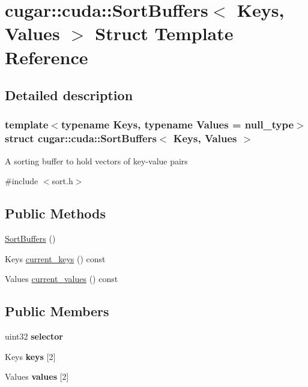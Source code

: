 \hypertarget{structcugar_1_1cuda_1_1_sort_buffers}{}\section{cugar\+:\+:cuda\+:\+:Sort\+Buffers$<$ Keys, Values $>$ Struct Template Reference}
\label{structcugar_1_1cuda_1_1_sort_buffers}


\subsection{Detailed description}
\subsubsection*{template$<$typename Keys, typename Values = null\+\_\+type$>$\newline
struct cugar\+::cuda\+::\+Sort\+Buffers$<$ Keys, Values $>$}

A sorting buffer to hold vectors of key-\/value pairs 

{\ttfamily \#include $<$sort.\+h$>$}

\subsection*{Public Methods}
\begin{DoxyCompactItemize}
\item 
\hyperlink{structcugar_1_1cuda_1_1_sort_buffers_a46b0e31a68ddb78edc546fbebb1e7744}{Sort\+Buffers} ()
\item 
Keys \hyperlink{structcugar_1_1cuda_1_1_sort_buffers_a91c33249e9f810ec895a62462c562722}{current\+\_\+keys} () const
\item 
Values \hyperlink{structcugar_1_1cuda_1_1_sort_buffers_a7d60fa78c28cc62db8b564323454bf3b}{current\+\_\+values} () const
\end{DoxyCompactItemize}
\subsection*{Public Members}
\begin{DoxyCompactItemize}
\item 
\mbox{\label{structcugar_1_1cuda_1_1_sort_buffers_a8fd662bec6ba60090b64bcca6ac6332b}} 
uint32 {\bfseries selector}
\item 
\mbox{\label{structcugar_1_1cuda_1_1_sort_buffers_ae3167881b62ed0faf3d1b74b206667a9}} 
Keys {\bfseries keys} \mbox{[}2\mbox{]}
\item 
\mbox{\label{structcugar_1_1cuda_1_1_sort_buffers_ab1cc0300b31ea1e8f89ccebe3a694a1a}} 
Values {\bfseries values} \mbox{[}2\mbox{]}
\end{DoxyCompactItemize}


